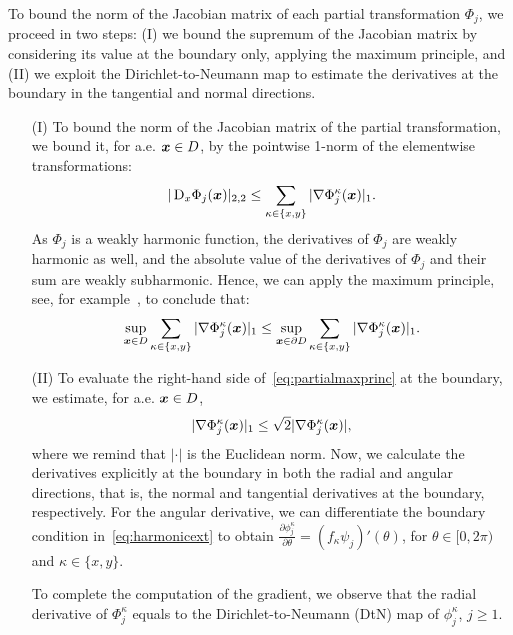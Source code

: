 To bound the norm of the Jacobian matrix of each partial transformation $\Phi_j$, we proceed in two steps: (I) we bound the supremum of the Jacobian matrix by considering its value at the boundary only, applying the maximum principle, and (II) we exploit the Dirichlet-to-Neumann map to estimate the derivatives at the boundary in the tangential and normal directions.

\begin{itemize}
    \item[(I)]
    To bound the norm of the Jacobian matrix of the partial transformation, we bound it, for a.e. ${{\bm{x}}} \in D$, by the pointwise 1-norm of the elementwise transformations:
    \begin{align*}
        |\mathop{}\!\mathrm{D}_x\Phi_j({{\bm{x}}})|_{2,2}
        \leq\sum_{\kappa \in \{x, y\}}  |\nabla \Phi_j^\kappa({{\bm{x}}})|_1.
    \end{align*}
    As $\Phi_j$ is a weakly harmonic function, the derivatives of $\Phi_j$ are weakly harmonic as well, and the absolute value of the derivatives of $\Phi_j$ and their sum are weakly subharmonic.
    Hence, we can apply the maximum principle, see, for example~\cite{serrin2011}, to conclude that:
    \begin{align}
        \sup_{{{\bm{x}}} \in D} \sum_{\kappa \in \{x, y\}}  |\nabla \Phi_j^\kappa ({{\bm{x}}})|_1 \leq \sup_{{{\bm{x}}} \in \partial D} \sum_{\kappa \in \{x, y\}}  |\nabla \Phi_j^\kappa({{\bm{x}}})|_1. \label{eq:partialmaxprinc}
    \end{align}
    \item[(II)]
    To evaluate the right-hand side of~\eqref{eq:partialmaxprinc} at the boundary, we estimate, for a.e. ${{\bm{x}}} \in D$,
    \begin{align*}
        |\nabla \Phi_j^\kappa({{\bm{x}}})|_1 \leq  \sqrt{2} |\nabla \Phi_j^\kappa({{\bm{x}}})|,
    \end{align*}
    where we remind that $|\cdot|$ is the Euclidean norm.
    Now, we calculate the derivatives explicitly at the boundary in both the radial and angular directions, that is, the normal and tangential derivatives at the boundary, respectively.
    For the angular derivative, we can differentiate the boundary condition in~\eqref{eq:harmonicext} to obtain $ \frac{\partial \phi_j^\kappa}{\partial \theta} = (f_\kappa\psi_j)'(\theta)$, for $\theta \in [0,2\pi)$ and $\kappa\in\{x,y\}$.

    To complete the computation of the gradient, we observe that the radial derivative of $\Phi_j^\kappa$ equals to the Dirichlet-to-Neumann (DtN) map of $\phi_j^\kappa$, $j\geq 1$.


\end{itemize}
